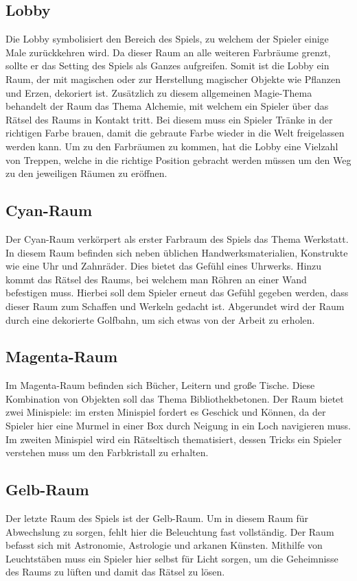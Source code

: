 \subsection{Lobby}
Die Lobby symbolisiert den Bereich des Spiels, zu welchem der Spieler einige Male zurückkehren wird. Da dieser Raum an alle weiteren Farbräume grenzt, sollte er das Setting des Spiels als Ganzes aufgreifen. Somit ist die Lobby ein Raum, der mit magischen oder zur Herstellung magischer Objekte wie Pflanzen und Erzen, dekoriert ist. Zusätzlich zu diesem allgemeinen Magie-Thema behandelt der Raum das Thema Alchemie, mit welchem ein Spieler über das Rätsel des Raums in Kontakt tritt. Bei diesem muss ein Spieler Tränke in der richtigen Farbe brauen, damit die gebraute Farbe wieder in die Welt freigelassen werden kann. Um zu den Farbräumen zu kommen, hat die Lobby eine Vielzahl von Treppen, welche in die richtige Position gebracht werden müssen um den Weg zu den jeweiligen Räumen zu eröffnen.

\subsection{Cyan-Raum}
Der Cyan-Raum verkörpert als erster Farbraum des Spiels das Thema \dq Werkstatt\dq. In diesem Raum befinden sich neben üblichen Handwerksmaterialien, Konstrukte wie eine Uhr und Zahnräder. Dies bietet das Gefühl eines Uhrwerks. Hinzu kommt das Rätsel des Raums, bei welchem man Röhren an einer Wand befestigen muss. Hierbei soll dem Spieler erneut das Gefühl gegeben werden, dass dieser Raum zum Schaffen und Werkeln gedacht ist. Abgerundet wird der Raum durch eine dekorierte Golfbahn, um sich etwas von der Arbeit zu erholen.

\subsection{Magenta-Raum}
Im Magenta-Raum befinden sich Bücher, Leitern und große Tische. Diese Kombination von Objekten soll das Thema \dq Bibliothek\dq betonen. Der Raum bietet zwei Minispiele: im ersten Minispiel fordert es Geschick und Können, da der Spieler hier eine Murmel in einer Box durch Neigung in ein Loch navigieren muss. Im zweiten Minispiel wird ein Rätseltisch thematisiert, dessen Tricks ein  Spieler verstehen muss um den Farbkristall zu erhalten.

\subsection{Gelb-Raum}
Der letzte Raum des Spiels ist der Gelb-Raum. Um in diesem Raum für Abwechslung zu sorgen, fehlt hier die Beleuchtung fast vollständig. Der Raum befasst sich mit Astronomie, Astrologie und arkanen Künsten. Mithilfe von Leuchtstäben muss ein Spieler hier selbst für Licht sorgen, um die Geheimnisse des Raums zu lüften und damit das Rätsel zu lösen.

